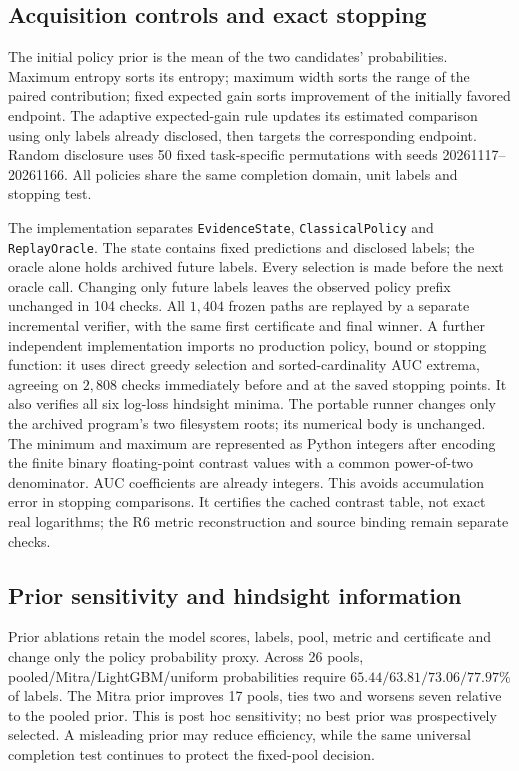 \FloatBarrier
\subsection{Acquisition controls and exact stopping}
The initial policy prior is the mean of the two candidates' probabilities. Maximum entropy sorts its entropy; maximum width sorts the range of the paired contribution; fixed expected gain sorts improvement of the initially favored endpoint. The adaptive expected-gain rule updates its estimated comparison using only labels already disclosed, then targets the corresponding endpoint. Random disclosure uses 50 fixed task-specific permutations with seeds 20261117--20261166. All policies share the same completion domain, unit labels and stopping test.

The implementation separates \nolinkurl{EvidenceState}, \nolinkurl{ClassicalPolicy} and \nolinkurl{ReplayOracle}. The state contains fixed predictions and disclosed labels; the oracle alone holds archived future labels. Every selection is made before the next oracle call. Changing only future labels leaves the observed policy prefix unchanged in 104 checks. All $1{,}404$ frozen paths are replayed by a separate incremental verifier, with the same first certificate and final winner. A further independent implementation imports no production policy, bound or stopping function: it uses direct greedy selection and sorted-cardinality AUC extrema, agreeing on $2{,}808$ checks immediately before and at the saved stopping points. It also verifies all six log-loss hindsight minima. The portable runner changes only the archived program's two filesystem roots; its numerical body is unchanged. The minimum and maximum are represented as Python integers after encoding the finite binary floating-point contrast values with a common power-of-two denominator. AUC coefficients are already integers. This avoids accumulation error in stopping comparisons. It certifies the cached contrast table, not exact real logarithms; the R6 metric reconstruction and source binding remain separate checks.




\FloatBarrier
\subsection{Prior sensitivity and hindsight information}
Prior ablations retain the model scores, labels, pool, metric and certificate and change only the policy probability proxy. Across 26 pools, pooled/Mitra/LightGBM/uniform probabilities require $65.44/63.81/73.06/77.97\%$ of labels. The Mitra prior improves 17 pools, ties two and worsens seven relative to the pooled prior. This is post hoc sensitivity; no best prior was prospectively selected. A misleading prior may reduce efficiency, while the same universal completion test continues to protect the fixed-pool decision.

